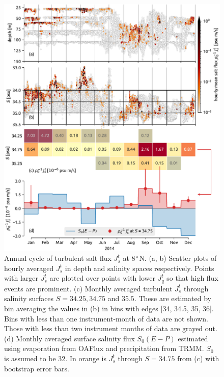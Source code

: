 \documentclass[onecol]{ametsoc}
\begin{document}
\begin{figure}
\centering
\includegraphics[width=\textwidth]{figure10-8n.pdf}
\caption{\label{fig:8njs}
\small Annual cycle of turbulent salt flux \(J_s^t\) at 8\(\degree\)N. (a, b) Scatter plots of hourly averaged \(J_s^t\) in depth and salinity spaces respectively. Points with larger \(J_s^t\) are plotted over points with lower \(J_q^t\) so that high flux events are prominent. (c) Monthly averaged turbulent \(J_s^t\) through salinity surfaces \(S=34.25, 34.75\) and \(35.5\). These are estimated by bin averaging the values in (b) in bins with edges [34, 34.5, 35, 36]. Bins with less than one instrument-month of data are not shown. Those with less than two instrument months of data are grayed out. (d) Monthly averaged surface salinity flux \(S_0 (E-P)\) estimated using evaporation from OAFlux and precipitation from TRMM. \(S_0\) is assumed to be 32. In orange is \(J_s^t\) through \(S=34.75\) from (c) with bootstrap error bars.}
\end{figure}
\end{document}
